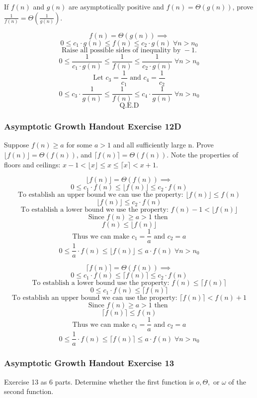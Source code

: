 \documentclass{article}
\begin{document}
If $f(n)$ and $g(n)$ are asymptotically positive and $f(n) = \Theta(g(n))$, prove $\frac{1}{f(n)} = \Theta(\frac{1}{g(n)})$.

$$f(n) = \Theta(g(n)) \implies$$
$$0 \le c_1 \cdot g(n) \le f(n) \le c_2 \cdot g(n) \; \forall n > n_0$$
$$\text{Raise all possible sides of inequality by } -1.$$
$$0 \le \frac{1}{c_1 \cdot g(n)} \le \frac{1}{f(n)} \le \frac{1}{c_2 \cdot g(n)} \; \forall n > n_0$$
$$\text{Let } c_3 = \frac{1}{c_1} \text{ and } c_4 = \frac{1}{c_2}$$
$$0 \le 
c_3 \cdot \frac{1}{g(n)} \le \frac{1}{f(n)} \le 
c_4 \cdot \frac{1}{g(n)} \; \forall n > n_0$$
$$\text{Q.E.D}$$

\subsubsection{Asymptotic Growth Handout Exercise 12D}

Suppose $f(n) \ge a$ for some $a > 1$ and all sufficiently large n. Prove $\lfloor f(n) \rfloor = \Theta(f(n))$, and $ \lceil f(n) \rceil= \Theta(f(n))$. Note the properties of floors and ceilings: $x - 1 < \lfloor x \rfloor \le x \le \lceil x \rceil < x + 1$.

$$\lfloor f(n) \rfloor = \Theta(f(n)) \implies$$
$$0 \le c_1 \cdot f(n) \le \lfloor f(n) \rfloor \le c_2 \cdot f(n) $$
$$\text{To establish an upper bound we can use the property: } \lfloor f(n) \rfloor \le f(n)$$
$$\lfloor f(n) \rfloor \le c_2 \cdot f(n)$$
$$\text{To establish a lower bound we use the property: } f(n) - 1 < \lfloor f(n) \rfloor$$
$$\text{Since } f(n) \ge a > 1 \text{ then } $$
$$f(n) \le \lfloor f(n) \rfloor$$
$$\text{Thus we can make } c_1 = \frac{1}{a} \text{ and } c_2 = a$$
$$0 \le \frac{1}{a} \cdot f(n) \le \lfloor f(n) \rfloor \le a \cdot f(n) \; \forall n > n_0$$

$$\lceil f(n) \rceil = \Theta(f(n)) \implies$$
$$0 \le c_1 \cdot f(n) \le \lceil f(n) \rceil \le c_2 \cdot f(n) $$
$$\text{To establish a lower bound use the property: } f(n) \le \lceil f(n) \rceil$$
$$0 \le c_1 \cdot f(n) \le \lceil f(n) \rceil$$
$$\text{To establish an upper bound we can use the property: } \lceil f(n) \rceil < f(n) + 1$$
$$\text{Since } f(n) \ge a > 1 \text{ then } $$
$$\lceil f(n) \rceil \le f(n)$$
$$\text{Thus we can make } c_1 = \frac{1}{a} \text{ and } c_2 = a$$
$$0 \le \frac{1}{a} \cdot f(n) \le \lceil f(n) \rceil \le a \cdot f(n) \; \forall n > n_0$$

\subsubsection{Asymptotic Growth Handout Exercise 13}
Exercise 13 as 6 parts. Determine whether the first function is $o,\Theta, \text{ or } \omega$ of the second function.
\end{document}
